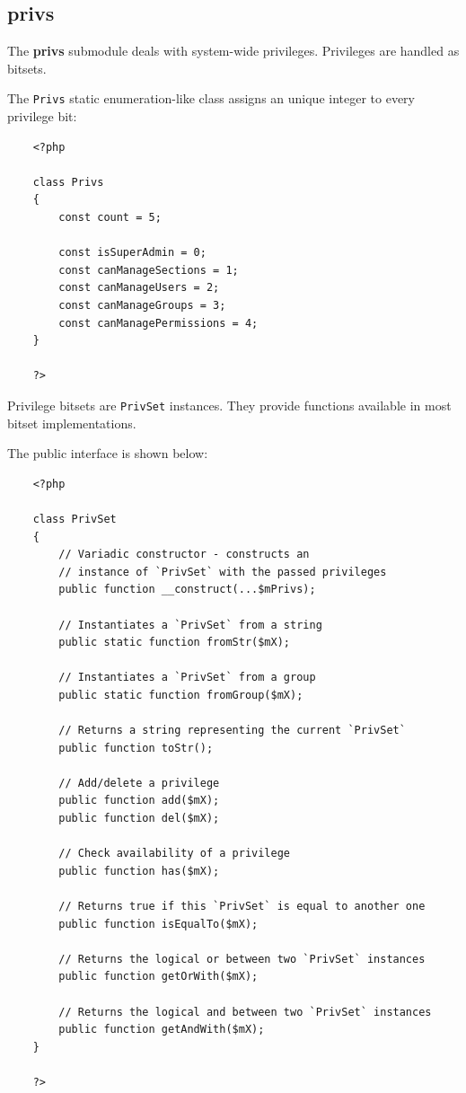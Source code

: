 \documentclass[12pt]{report}
\renewcommand\emph{\textbf}
\begin{document}
                \subsection{privs}

                    The \emph{privs} submodule deals with system-wide privileges. Privileges are handled as bitsets.

                    The \texttt{Privs} static enumeration-like class assigns an unique integer to every privilege bit:

                    \begin{verbatim}
    <?php

    class Privs
    {
        const count = 5;

        const isSuperAdmin = 0;
        const canManageSections = 1;
        const canManageUsers = 2;
        const canManageGroups = 3;
        const canManagePermissions = 4;
    }

    ?>
                    \end{verbatim}

                    Privilege bitsets are \texttt{PrivSet} instances. They provide functions available in most bitset implementations.

                    The public interface is shown below:
 
                    \begin{verbatim}
    <?php

    class PrivSet
    {
        // Variadic constructor - constructs an
        // instance of `PrivSet` with the passed privileges
        public function __construct(...$mPrivs);

        // Instantiates a `PrivSet` from a string
        public static function fromStr($mX);

        // Instantiates a `PrivSet` from a group
        public static function fromGroup($mX);

        // Returns a string representing the current `PrivSet`
        public function toStr();

        // Add/delete a privilege
        public function add($mX);
        public function del($mX);

        // Check availability of a privilege
        public function has($mX);

        // Returns true if this `PrivSet` is equal to another one
        public function isEqualTo($mX);

        // Returns the logical or between two `PrivSet` instances
        public function getOrWith($mX);

        // Returns the logical and between two `PrivSet` instances
        public function getAndWith($mX);
    }

    ?>                        
                    \end{verbatim}
\end{document}
